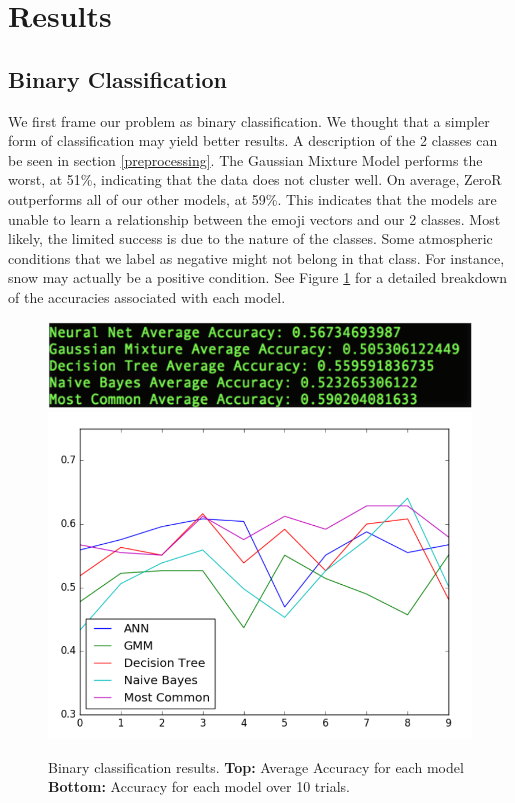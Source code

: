 \documentclass[12pt]{article}
\begin{document}
\section{Results}\label{results}

\subsection{Binary Classification}
We first frame our problem as binary classification. We thought that a simpler form of classification may yield better results. A description of the 2 classes can be seen in section \ref{preprocessing}. The Gaussian Mixture Model performs the worst, at 51\%, indicating that the data does not cluster well. On average, ZeroR outperforms all of our other models, at 59\%. This indicates that the models are unable to learn a relationship between the emoji vectors and our 2 classes. Most likely, the limited success is due to the nature of the classes. Some atmospheric conditions that we label as negative might not belong in that class. For instance, snow may actually be a positive condition. See Figure \ref{fig:binary} for a detailed breakdown of the accuracies associated with each model.

\begin{figure}[hb]
\includegraphics[scale=0.6]{binaryavg}
\includegraphics[scale=0.7]{binarygraph}
\centering
\caption{Binary classification results. \textbf{Top:} Average Accuracy for each model \textbf{Bottom:} Accuracy for each model over 10 trials.}
\label{fig:binary}
\end{figure}
\end{document}
